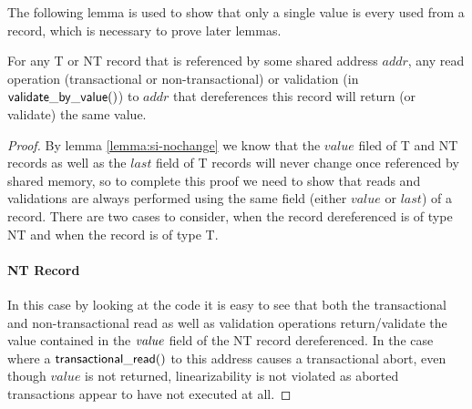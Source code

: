 The following lemma is used to show that only a single value is every used from
a record, which is necessary to prove later lemmas.
\begin{lemma}
\label{lemma:si-samevalue}
For any T or NT record that is referenced by some shared address $\mathit{addr}$, any read operation
(transactional or non-transactional) or validation (in $\sf{validate\_by\_value}()$) to
$\mathit{addr}$ that dereferences this record will return (or validate) the same value.
\end{lemma}
\begin{proof}
By lemma \ref{lemma:si-nochange} we know that the $\mathit{value}$ filed of T and NT records as well as the $\mathit{last}$ field
of T records will never change once referenced by shared memory, so to complete this proof we need to show that reads and validations
are always performed using the same field (either $\mathit{value}$ or $\mathit{last}$) of a record.
There are two cases to consider, when the record dereferenced is of type NT and when the record is of type T.
\paragraph{NT Record} In this case by looking at the code it is easy to see that both the transactional and non-transactional read
as well as validation operations
return/validate the value contained in the $\ms{value}$ field of the NT record dereferenced.
In the case where a $\sf{transactional\_read}()$ to this address causes a transactional abort,
even though $\mathit{value}$ is not returned, linearizability is not violated
as aborted transactions appear to have not executed at all.

\end{proof}
